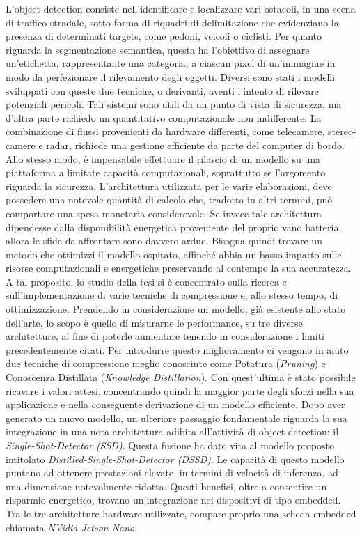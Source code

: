 L'object detection consiste nell'identificare e localizzare vari ostacoli, in una scena di traffico stradale, sotto forma di riquadri di delimitazione che evidenziano la presenza di determinati targets, come pedoni, veicoli o ciclisti. Per quanto riguarda la segmentazione semantica, questa ha l'obiettivo di assegnare un'etichetta, rappresentante una categoria, a ciascun pixel di un'immagine in modo da perfezionare il rilevamento degli oggetti. Diversi sono stati i modelli sviluppati con queste due tecniche, o derivanti, aventi l'intento di rilevare potenziali pericoli. Tali sistemi sono utili da un punto di vista di sicurezza, ma d'altra parte richiedo un quantitativo computazionale non indifferente. La combinazione di flussi provenienti da hardware differenti, come telecamere, stereo-camere e radar, richiede una gestione efficiente da parte del computer di bordo. Allo stesso modo, è impensabile effettuare il rilascio di un modello su una piattaforma a limitate capacità computazionali, soprattutto se l'argomento riguarda la sicurezza. L'architettura utilizzata per le varie elaborazioni, deve possedere una notevole quantità di calcolo che, tradotta in altri termini, può comportare una spesa monetaria considerevole. Se invece tale architettura dipendesse dalla disponibilità energetica proveniente del proprio vano batteria, allora le sfide da affrontare sono davvero ardue. Bisogna quindi trovare un metodo che ottimizzi il modello ospitato, affinché abbia un basso impatto sulle risorse computazionali e energetiche preservando al contempo la sua accuratezza. A tal proposito, lo studio della tesi si è concentrato sulla ricerca e sull'implementazione di varie tecniche di compressione e, allo stesso tempo, di ottimizzazione. Prendendo in considerazione un modello, già esistente allo stato dell'arte, lo scopo è quello di misurarne le performance, su tre diverse architetture, al fine di poterle aumentare tenendo in considerazione i limiti precedentemente citati. Per introdurre questo miglioramento ci vengono in aiuto due tecniche di compressione meglio conosciute come Potatura (\emph{Pruning}) e Conoscenza Distillata (\emph{Knowledge Distillation}).
Con quest'ultima è stato possibile ricavare i valori attesi, concentrando quindi la maggior parte degli sforzi nella sua applicazione e nella conseguente derivazione di un modello efficiente. Dopo aver generato un nuovo modello, un ulteriore passaggio fondamentale riguarda la sua integrazione in una nota architettura adibita all'attività di object detection: il \emph{Single-Shot-Detector (SSD)}.
Questa fusione ha dato vita al modello proposto intitolato \emph{Distilled-Single-Shot-Detector (DSSD)}. Le capacità di questo modello puntano ad ottenere prestazioni elevate, in termini di velocità di inferenza, ad una dimensione notevolmente ridotta. Questi benefici, oltre a consentire un risparmio energetico, trovano un'integrazione nei dispositivi di tipo embedded. Tra le tre architetture hardware utilizzate, compare proprio una scheda embedded chiamata \emph{NVidia Jetson Nano}.
